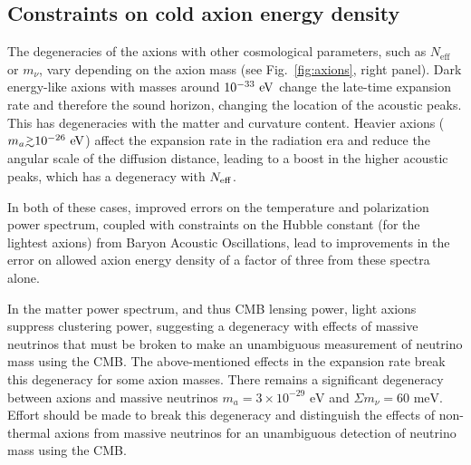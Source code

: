 \subsection{Constraints on cold axion energy density \label{sec:uladiabat}}

The degeneracies of the axions with other cosmological parameters, such as $N_\mathrm{eff}$ or $m_\nu$, vary depending on the axion mass (see Fig.~\ref{fig:axions}, right panel). Dark energy-like axions with masses around $10^{-33}~{\rm eV}$ change the late-time expansion rate and therefore the sound horizon, changing the location of the acoustic peaks. This has degeneracies with the matter and curvature content. 
Heavier axions ($m_a \gtrsim 10^{-26}~{\rm eV}$) affect the expansion rate in the radiation era and reduce the angular scale of the diffusion distance, leading to a boost in the higher acoustic peaks, which has a degeneracy with $N_{\rm eff}$. 

In both of these cases, improved errors on the temperature and polarization power spectrum, coupled with constraints on the Hubble constant (for the lightest axions) from Baryon Acoustic Oscillations, lead to improvements in the error on allowed axion energy density of a factor of three from these spectra alone. 

In the matter power spectrum, and thus CMB lensing power, light axions suppress clustering power, suggesting a degeneracy with effects of massive neutrinos that must be broken to make an unambiguous measurement of neutrino mass using the CMB. The above-mentioned effects in the expansion rate break this degeneracy for some axion masses. There remains a significant degeneracy between axions and massive neutrinos $m_a=3\times 10^{-29}\text{ eV}$ and $\Sigma m_\nu=60\text{ meV}$. Effort should be made to break this degeneracy and distinguish the effects of non-thermal axions from massive neutrinos for an unambiguous detection of neutrino mass using the CMB. 

